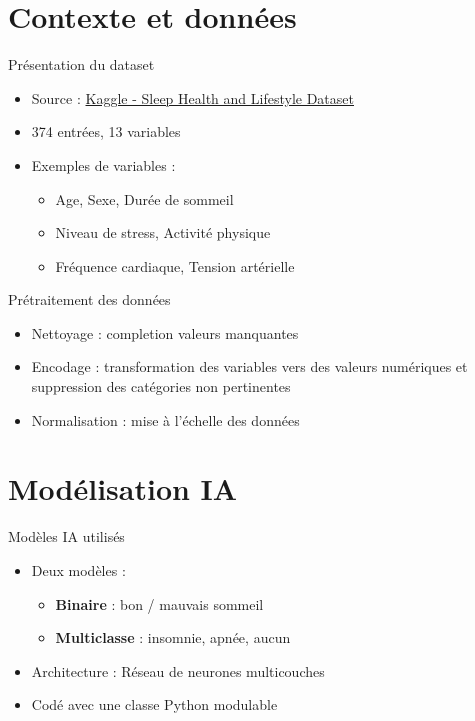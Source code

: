 \documentclass{beamer}
\begin{document}
\section{Contexte et données}

\begin{frame}{Présentation du dataset}
  \begin{itemize}
    \item Source : \href{https://www.kaggle.com/datasets/uom190346a/sleep-health-and-lifestyle-dataset}{Kaggle - Sleep Health and Lifestyle Dataset}
    \item 374 entrées, 13 variables
    \item Exemples de variables :
    \begin{itemize}
      \item Age, Sexe, Durée de sommeil
      \item Niveau de stress, Activité physique
      \item Fréquence cardiaque, Tension artérielle
    \end{itemize}
  \end{itemize}
\end{frame}

\begin{frame}{Prétraitement des données}
  \begin{itemize}
    \item Nettoyage : completion valeurs manquantes
    \item Encodage : transformation des variables vers des valeurs numériques et suppression des catégories non pertinentes
    \item Normalisation : mise à l'échelle des données
  \end{itemize}
\end{frame}

\section{Modélisation IA}

\begin{frame}{Modèles IA utilisés}
  \begin{itemize}
    \item Deux modèles :
    \begin{itemize}
      \item \textbf{Binaire} : bon / mauvais sommeil
      \item \textbf{Multiclasse} : insomnie, apnée, aucun
    \end{itemize}
    \item Architecture : Réseau de neurones multicouches
    \item Codé avec une classe Python modulable
  \end{itemize}
\end{frame}
\end{document}
